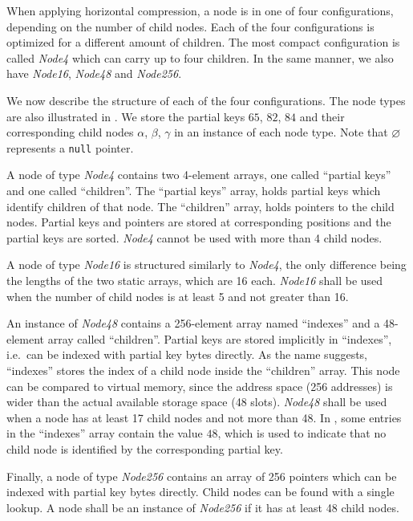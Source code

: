 \documentclass[abstracton,12pt]{scrartcl}
\theoremstyle{definition}
\begin{document}
When applying horizontal compression, a node is in one of four configurations, 
depending on the number of child nodes. Each of the four configurations is 
optimized for a different amount of children. The most compact configuration 
is called \textit{Node4} which can carry up to four children. 
In the same manner, we also have \textit{Node16}, \textit{Node48} 
and \textit{Node256}.

We now describe the structure of each of the four configurations.
The node types are also illustrated in .
We store the partial keys $65$, $82$, $84$ and their corresponding child nodes
$\alpha$, $\beta$, $\gamma$ in an instance of each node type. 
Note that $\varnothing$ represents a \texttt{null} pointer.

A node of type \textit{Node4} contains two 4-element arrays, one called
``partial keys'' and one called ``children''.
The ``partial keys'' array, holds
partial keys which identify children of that node. 
The ``children'' array, holds pointers to the child nodes.
Partial keys and pointers are stored at corresponding positions and
the partial keys are sorted. \textit{Node4} cannot be used with more than 
4 child nodes.

A node of type \textit{Node16} is structured similarly
to \textit{Node4}, the only difference being the lengths of the two static 
arrays, which are 16 each. \textit{Node16} shall be used when the number of 
child nodes is at least 5 and not greater than 16.

An instance of \textit{Node48} contains a 256-element array named 
``indexes'' and a 48-element array called ``children''.
Partial keys are stored implicitly in ``indexes'', i.e.\ 
can be indexed with partial key bytes directly.
As the name suggests, ``indexes'' stores the index of a child
node inside the ``children'' array. This node can be compared to
virtual memory, since the address space (256 addresses) is wider 
than the actual available storage space (48 slots). \textit{Node48}
shall be used when a node has at least 17 child nodes and not more
than 48. In \Cref{fig:horizontal-compression}, some entries in the
``indexes'' array contain the value $48$, which is used to indicate that
no child node is identified by the corresponding partial key.

Finally, a node of type \textit{Node256} contains an array of
256 pointers which can be indexed with partial key bytes directly.
Child nodes can be found with a single lookup. A node shall be an instance
of \textit{Node256} if it has at least 48 child nodes.
\end{document}
